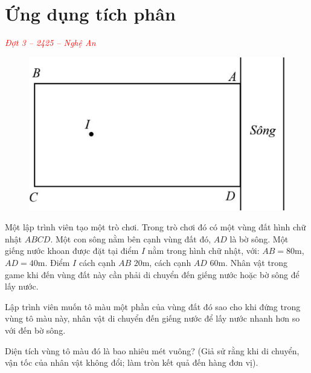 \documentclass[twoside,final]{hcmut-report}
\newcommand{\exercise}[1]{\begin{exercisebox}#1\end{exercisebox}}
\begin{document}
\section{Ứng dụng tích phân}
\exercise{
    \textcolor{red}{\textit{Đợt 3 -- 2425 -- Nghệ An}}

    \begin{figure}
        \centering
        \includegraphics*[width=1.03\linewidth]{images/Nghệ An 2025 - Đợt 3/NgheAn25-5.png}
    \end{figure}

    Một lập trình viên tạo một trò chơi. Trong trò chơi đó có một vùng đất hình chữ nhật $ABCD$. Một con sông nằm bên cạnh vùng đất đó, $AD$ là bờ sông. Một giếng nước khoan được đặt tại điểm $I$ nằm trong hình chữ nhật, với:
    $AB = 80$m, $AD = 40$m. Điểm $I$ cách cạnh $AB$ $20$m, cách cạnh $AD$ $60$m. Nhân vật trong game khi đến vùng đất này cần phải di chuyển đến giếng nước hoặc bờ sông để lấy nước.

    Lập trình viên muốn tô màu một phần của vùng đất đó sao cho khi đứng trong vùng tô màu này, nhân vật di chuyển đến giếng nước để lấy nước nhanh hơn so với đến bờ sông.

    Diện tích vùng tô màu đó là bao nhiêu mét vuông? (Giả sử rằng khi di chuyển, vận tốc của nhân vật không đổi; làm tròn kết quả đến hàng đơn vị).

}
\end{document}

